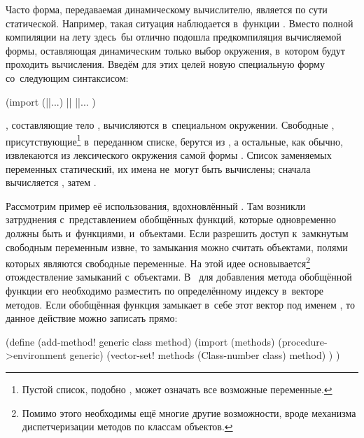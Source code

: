 Часто форма, передаваемая динамическому вычислителю, является по сути
статической. Например, такая ситуация наблюдается в~функции
. Вместо полной компиляции на лету здесь~бы отлично подошла
предкомпиляция вычисляемой формы, оставляющая динамическим только выбор
окружения, в~котором будут проходить вычисления. Введём для этих целей новую
специальную форму  со~следующим синтаксисом:

\begin{code:lisp}
(import (||...) ||
  ||... )
\end{code:lisp}

, составляющие тело , вычисляются в~специальном окружении.
Свободные , присутствующие\footnote{Пустой список, подобно
, может означать все возможные переменные.} в~переданном списке,
берутся из , а остальные, как обычно, извлекаются из лексического
окружения самой формы . Список заменяемых переменных статический,
их имена не~могут быть вычислены; сначала вычисляется , затем
.

Рассмотрим пример её использования, вдохновлённый {\Meroonet}. Там возникли
затруднения с~представлением обобщённых функций, которые одновременно должны
быть и~функциями, и~объектами. Если разрешить доступ к~замкнутым свободным
переменным извне, то замыкания можно считать объектами, полями которых являются
свободные переменные. На этой идее основывается\footnote{Помимо этого необходимы
ещё многие другие возможности, вроде механизма диспетчеризации методов по
классам объектов.} отождествление замыканий с~объектами. В~{\Meroonet} для
добавления метода обобщённой функции его необходимо разместить по определённому
индексу в~векторе методов. Если обобщённая функция замыкает в~себе этот вектор
под именем , то данное действие можно записать прямо:

\begin{code:lisp}
(define (add-method! generic class method)
  (import (methods) (procedure->environment generic)
    (vector-set! methods (Class-number class) method) ) )
\end{code:lisp}

